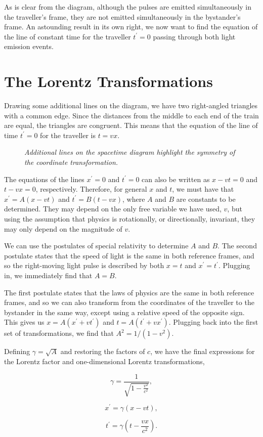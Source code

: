 \documentclass[12pt]{article}
\begin{document}
\vspace{1.6em}

As is clear from the diagram, although the pulses are emitted simultaneously in the traveller's frame, they are not emitted simultaneously in the bystander's frame. An astounding result in its own right, we now want to find the equation of the line of constant time for the traveller $t^\prime=0$ passing through both light emission events.

\section{The Lorentz Transformations}

Drawing some additional lines on the diagram, we have two right-angled triangles with a common edge. Since the distances from the middle to each end of the train are equal, the triangles are congruent. This means that the equation of the line of time $t^\prime=0$ for the traveller is $t=vx$.
\newline

\begin{figure}[htbp]
\centering

\caption{\textit{Additional lines on the spacetime diagram highlight the symmetry of the coordinate transformation.}}
\label{fig:LT4}
\end{figure}

\vspace{2em}

The equations of the lines $x^\prime=0$ and $t^\prime=0$ can also be written as $x-vt=0$ and $t-vx=0$, respectively. Therefore, for general $x$ and $t$, we must have that $x^\prime=A\left(x-vt\right)$ and $t^\prime=B\left(t-vx\right)$, where $A$ and $B$ are constants to be determined. They may depend on the only free variable we have used, $v$, but using the assumption that physics is rotationally, or directionally, invariant, they may only depend on the magnitude of $v$.
\newline

We can use the postulates of special relativity to determine $A$ and $B$. The second postulate states that the speed of light is the same in both reference frames, and so the right-moving light pulse is described by both $x=t$ and $x^\prime=t^\prime$. Plugging in, we immediately find that $A=B$.
\newline

The first postulate states that the laws of physics are the same in both reference frames, and so we can also transform from the coordinates of the traveller to the bystander in the same way, except using a relative speed of the opposite sign. This gives us $x=A\left(x^\prime+vt^\prime\right)$ and $t=A\left(t^\prime+vx^\prime\right)$. Plugging back into the first set of transformations, we find that $A^2=1/\left(1-v^2\right)$.
\newline

Defining $\gamma=\sqrt{A}$ and restoring the factors of $c$, we have the final expressions for the Lorentz factor and one-dimensional Lorentz transformations,

$$\gamma=\frac{1}{\sqrt{1-\frac{v^2}{c^2}}},$$

$$x^\prime=\gamma\left(x-vt\right),$$

$$t^\prime=\gamma\left(t-\frac{vx}{c^2}\right).$$
\end{document}
